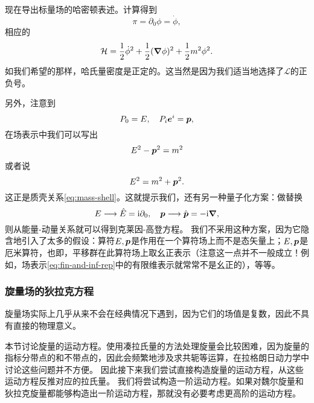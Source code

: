 \documentclass[hyperref, UTF8, a4paper]{ctexart}
\newcommand*{\ii}{\mathrm{i}}
\begin{document}
现在导出标量场的哈密顿表述。计算得到
\begin{equation}
    \pi = \partial_0 \phi = \dot{\phi},
    \label{eq:klein-gordon-pi}
\end{equation}
相应的
\begin{equation}
    \mathcal{H} = \frac{1}{2} \dot{\phi}^2 + \frac{1}{2} (\grad{\phi})^2 + \frac{1}{2} m^2 \phi^2.
\end{equation}
如我们希望的那样，哈氏量密度是正定的。这当然是因为我们适当地选择了$\mathcal{L}$的正负号。

另外，注意到 %
\[
    P_0 = E, \quad P_i \vb*{e}^i = \vb*{p},
\]
在场表示中我们可以写出
\[
    E^2 - \vb*{p}^2 = m^2
\]
或者说
\[
    E^2 = m^2 + \vb*{p}^2.
\]
这正是质壳关系\eqref{eq:mass-shell}。这就提示我们，还有另一种量子化方案：做替换
\[
    E \longrightarrow \hat{E} = \ii \partial_0, \quad \vb*{p} \longrightarrow \hat{\vb*{p}} = - \ii \grad,
\]
则从能量-动量关系就可以得到克莱因-高登方程。
我们不采用这种方案，因为它隐含地引入了太多的假设：算符$E, \vb*{p}$是作用在一个算符场上而不是态矢量上；$E,\vb*{p}$是厄米算符，也即，平移群在此算符场上取幺正表示（注意这一点并不一般成立！例如，场表示\eqref{eq:fin-and-inf-rep}中的有限维表示就常常不是幺正的），等等。

\subsubsection{旋量场的狄拉克方程}

旋量场实际上几乎从来不会在经典情况下遇到，因为它们的场值是复数，因此不具有直接的物理意义。

本节讨论旋量的运动方程。使用凑拉氏量的方法处理旋量会比较困难，因为旋量的指标分带点的和不带点的，因此会频繁地涉及求共轭等运算，在拉格朗日动力学中讨论这些问题并不方便。
因此接下来我们尝试直接构造旋量的运动方程，从这些运动方程反推对应的拉氏量。
我们将尝试构造一阶运动方程。如果对魏尔旋量和狄拉克旋量都能够构造出一阶运动方程，那就没有必要考虑更高阶的运动方程。
\end{document}
